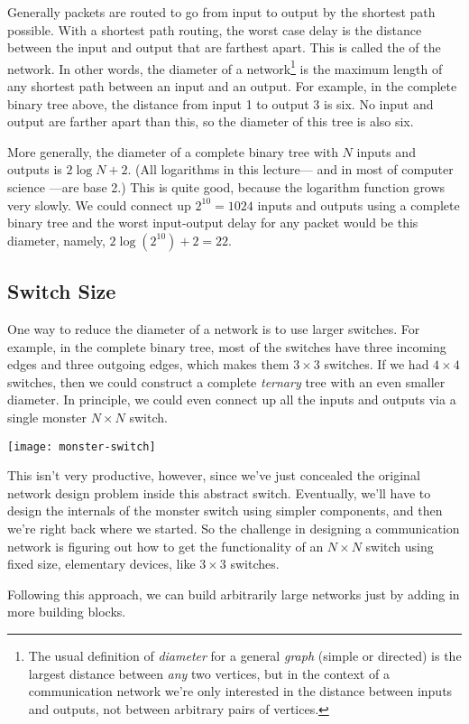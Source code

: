 Generally packets are routed to go from input to output by the shortest
path possible.  With a shortest path routing, the worst case delay is the
distance between the input and output that are farthest apart.  This is
called the  of the network.  In other words, the diameter
of a network\footnote{The usual definition of \emph{diameter} for a
general \textit{graph} (simple or directed) is the largest distance
between \emph{any} two vertices, but in the context of a communication
network we're only interested in the distance between inputs and outputs,
not between arbitrary pairs of vertices.} is the maximum length of any
shortest path between an input and an output.  For example, in the
complete binary tree above, the distance from input 1 to output 3 is six.
No input and output are farther apart than this, so the diameter of this
tree is also six.

More generally, the diameter of a complete binary tree with $N$ inputs and
outputs is $2 \log N + 2$.  (All logarithms in this lecture--- and in most
of computer science ---are base 2.)  This is quite good, because the
logarithm function grows very slowly.  We could connect up $2^{10} = 1024$
inputs and outputs using a complete binary tree and the worst input-output
delay for any packet would be this diameter, namely, $2 \log(2^{10}) + 2 =
22$.

\subsection{Switch Size}

One way to reduce the diameter of a network is to use larger switches.
For example, in the complete binary tree, most of the switches have
three incoming edges and three outgoing edges, which makes them $3
\times 3$ switches.  If we had $4 \times 4$ switches, then we could
construct a complete \textit{ternary} tree with an even smaller
diameter.  In principle, we could even connect up all the inputs and
outputs via a single monster $N \times N$ switch.

\begin{editingnotes}
\texttt{[image: monster-switch]}
\end{editingnotes}

This isn't very productive, however, since we've just concealed the
original network design problem inside this abstract switch.
Eventually, we'll have to design the internals of the monster switch
using simpler components, and then we're right back where we started.
So the challenge in designing a communication network is figuring out
how to get the functionality of an $N \times N$ switch using
fixed size, elementary devices, like $3 \times 3$ switches.
\begin{solution}
Following this approach, we can build arbitrarily large networks
just by adding in more building blocks. 
\end{solution}

